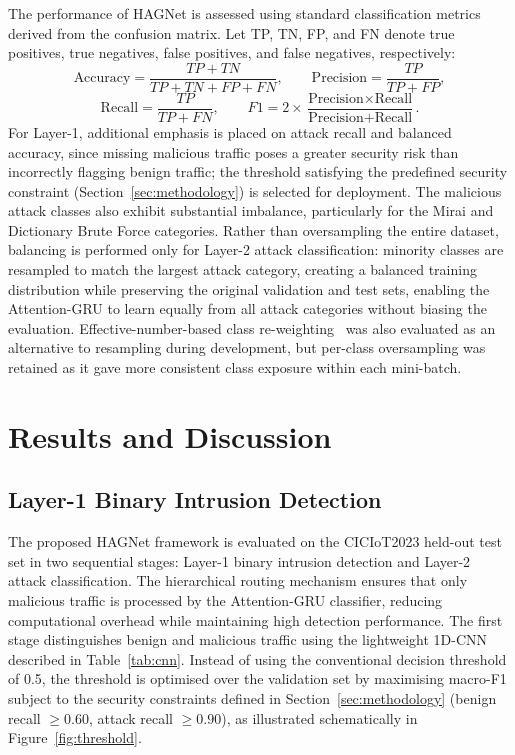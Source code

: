 \documentclass{llncs}
\begin{document}
The performance of HAGNet is assessed using standard classification metrics derived from the confusion matrix. Let TP, TN, FP, and FN denote true positives, true negatives, false positives, and false negatives, respectively:
\begin{equation}
\text{Accuracy} = \frac{TP + TN}{TP + TN + FP + FN}, \qquad
\text{Precision} = \frac{TP}{TP + FP},
\end{equation}
\begin{equation}
\text{Recall} = \frac{TP}{TP + FN}, \qquad
F1 = 2 \times \frac{\text{Precision} \times \text{Recall}}{\text{Precision} + \text{Recall}}.
\end{equation}
For Layer-1, additional emphasis is placed on attack recall and balanced accuracy, since missing malicious traffic poses a greater security risk than incorrectly flagging benign traffic; the threshold satisfying the predefined security constraint (Section~\ref{sec:methodology}) is selected for deployment. The malicious attack classes also exhibit substantial imbalance, particularly for the Mirai and Dictionary Brute Force categories. Rather than oversampling the entire dataset, balancing is performed only for Layer-2 attack classification: minority classes are resampled to match the largest attack category, creating a balanced training distribution while preserving the original validation and test sets, enabling the Attention-GRU to learn equally from all attack categories without biasing the evaluation. Effective-number-based class re-weighting~\cite{ref15} was also evaluated as an alternative to resampling during development, but per-class oversampling was retained as it gave more consistent class exposure within each mini-batch.

\section{Results and Discussion}
\label{sec:results}

\subsection{Layer-1 Binary Intrusion Detection}

The proposed HAGNet framework is evaluated on the CICIoT2023 held-out test set in two sequential stages: Layer-1 binary intrusion detection and Layer-2 attack classification. The hierarchical routing mechanism ensures that only malicious traffic is processed by the Attention-GRU classifier, reducing computational overhead while maintaining high detection performance. The first stage distinguishes benign and malicious traffic using the lightweight 1D-CNN described in Table~\ref{tab:cnn}. Instead of using the conventional decision threshold of 0.5, the threshold is optimised over the validation set by maximising macro-F1 subject to the security constraints defined in Section~\ref{sec:methodology} (benign recall $\geq 0.60$, attack recall $\geq 0.90$), as illustrated schematically in Figure~\ref{fig:threshold}.
\end{document}
